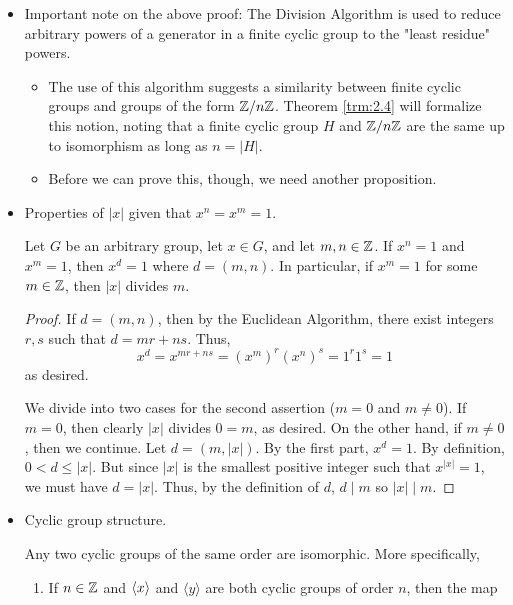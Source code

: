 \documentclass[../notes.tex]{subfiles}
\begin{document}
\begin{itemize}
\begin{proposition}
    \end{proposition}
    \item Important note on the above proof: The Division Algorithm is used to reduce arbitrary powers of a generator in a finite cyclic group to the "least residue" powers.
    \begin{itemize}
        \item The use of this algorithm suggests a similarity between finite cyclic groups and groups of the form $\mathbb{Z}/n\mathbb{Z}$. Theorem \ref{trm:2.4} will formalize this notion, noting that a finite cyclic group $H$ and $\mathbb{Z}/n\mathbb{Z}$ are the same up to isomorphism as long as $n=|H|$.
        \item Before we can prove this, though, we need another proposition.
    \end{itemize}
    \item Properties of $|x|$ given that $x^n=x^m=1$.
    \begin{proposition}\label{prp:2.3}
        Let $G$ be an arbitrary group, let $x\in G$, and let $m,n\in\mathbb{Z}$. If $x^n=1$ and $x^m=1$, then $x^d=1$ where $d=(m,n)$. In particular, if $x^m=1$ for some $m\in\mathbb{Z}$, then $|x|$ divides $m$.
        \begin{proof}
            If $d=(m,n)$, then by the Euclidean Algorithm, there exist integers $r,s$ such that $d=mr+ns$. Thus,
            \begin{equation*}
                x^d = x^{mr+ns}
                = (x^m)^r(x^n)^s
                = 1^r1^s
                = 1
            \end{equation*}
            as desired.\par
            We divide into two cases for the second assertion ($m=0$ and $m\neq 0$). If $m=0$, then clearly $|x|$ divides $0=m$, as desired. On the other hand, if $m\neq 0$, then we continue. Let $d=(m,|x|)$. By the first part, $x^d=1$. By definition, $0<d\leq |x|$. But since $|x|$ is the smallest positive integer such that $x^{|x|}=1$, we must have $d=|x|$. Thus, by the definition of $d$, $d\mid m$ so $|x|\mid m$.
        \end{proof}
    \end{proposition}
    \item Cyclic group structure.
    \begin{theorem}\label{trm:2.4}
        Any two cyclic groups of the same order are isomorphic. More specifically,
        \begin{enumerate}
            \item If $n\in\mathbb{Z}$ and $\left\langle{x}\right\rangle$ and $\langle y\rangle$ are both cyclic groups of order $n$, then the map

\end{enumerate}
\end{theorem}
\end{itemize}
\end{document}
